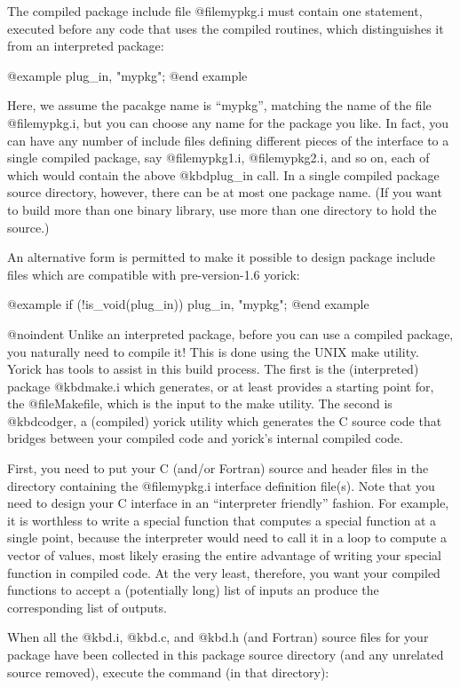 The compiled package include file @file{mypkg.i} must contain one
statement, executed before any code that uses the compiled routines,
which distinguishes it from an interpreted package:

@example
plug_in, "mypkg";
@end example

Here, we assume the pacakge name is ``mypkg'', matching the name of
the file @file{mypkg.i}, but you can choose any name for the package
you like.  In fact, you can have any number of include files defining
different pieces of the interface to a single compiled package, say
@file{mypkg1.i}, @file{mypkg2.i}, and so on, each of which would
contain the above @kbd{plug_in} call.  In a single compiled package
source directory, however, there can be at most one package name.  (If
you want to build more than one binary library, use more than one
directory to hold the source.)

An alternative form is permitted to make it possible to design package
include files which are compatible with pre-version-1.6 yorick:

@example
if (!is_void(plug_in)) plug_in, "mypkg";
@end example

@noindent
Unlike an interpreted package, before you can use a compiled package,
you naturally need to compile it!  This is done using the UNIX make
utility.  Yorick has tools to assist in this build process.  The first
is the (interpreted) package @kbd{make.i} which generates, or at least
provides a starting point for, the @file{Makefile}, which is the input
to the make utility.  The second is @kbd{codger}, a (compiled) yorick
utility which generates the C source code that bridges between your
compiled code and yorick's internal compiled code.

First, you need to put your C (and/or Fortran) source and header files
in the directory containing the @file{mypkg.i} interface definition
file(s).  Note that you need to design your C interface in an
``interpreter friendly'' fashion.  For example, it is worthless to
write a special function that computes a special function at a single
point, because the interpreter would need to call it in a loop to
compute a vector of values, most likely erasing the entire advantage
of writing your special function in compiled code.  At the very least,
therefore, you want your compiled functions to accept a (potentially
long) list of inputs an produce the corresponding list of outputs.

When all the @kbd{.i}, @kbd{.c}, and @kbd{.h} (and Fortran) source
files for your package have been collected in this package source
directory (and any unrelated source removed), execute the command
(in that directory):

